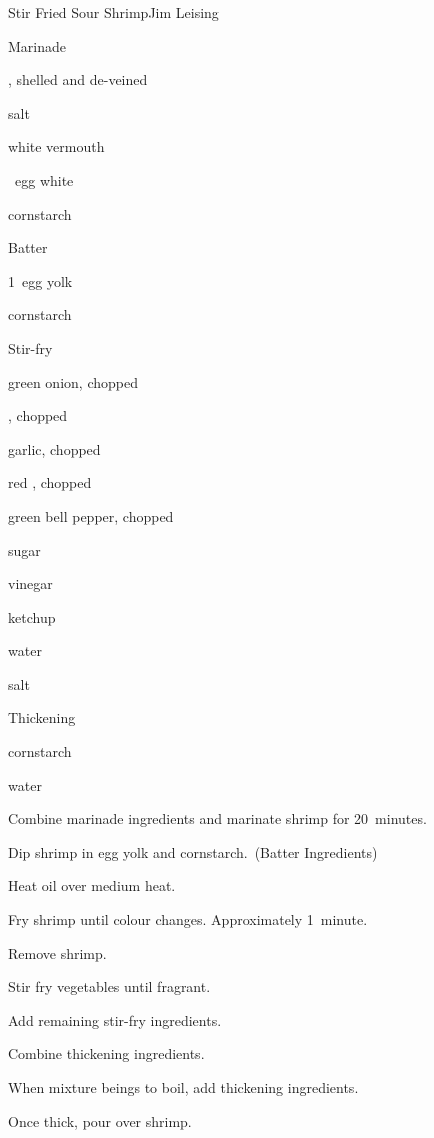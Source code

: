 \begin{recipe}{Stir Fried Sour Shrimp}{Jim Leising}{}

Marinade
\begin{ingredients}
\item \lbs{\twothird} , shelled and de-veined
\item \tp{\quarter} salt
\item \tp{\half} white vermouth
\item \half~egg white
\item {} cornstarch
\end{ingredients}

Batter
\begin{ingredients}
\item 1~egg yolk
\item \Tp{1\half} cornstarch
\end{ingredients}

Stir-fry
\begin{ingredients}
\item \Tp{\half} green onion, chopped
\item \Tp{\half} , chopped
\item \Tp{\half} garlic, chopped
\item \Tp{\half} red , chopped
\item {} green bell pepper, chopped
\item {} sugar
\item {} vinegar
\item {} ketchup
\item {} water
\item \tp{\quarter} salt
\end{ingredients}

Thickening
\begin{ingredients}
\item \tp{\half} cornstarch
\item \Tp{\half} water
\end{ingredients}

\begin{directions}
\item Combine marinade ingredients and marinate shrimp for 20~minutes.
\item Dip shrimp in egg yolk and cornstarch.~(Batter Ingredients)
\item Heat oil over medium heat.
\item Fry shrimp until colour changes. Approximately 1~minute.
\item Remove shrimp.
\item Stir fry vegetables until fragrant.
\item Add remaining stir-fry ingredients.
\item Combine thickening ingredients.
\item When mixture beings to boil, add thickening ingredients.
\item Once thick, pour over shrimp.
\end{directions}

\end{recipe}
